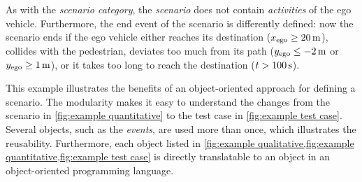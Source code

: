 As with the \textit{scenario category}, the \textit{scenario} does not contain \textit{activities} of the ego vehicle. 
\cstartb Furthermore, the end event of the scenario is differently defined: now the scenario ends if the ego vehicle either reaches its destination ($x_{\mathrm{ego}} \geq \SI{20}{\meter}$), collides with the pedestrian, deviates too much from its path ($y_{\mathrm{ego}} \leq \SI{-2}{\meter}$ or $y_{\mathrm{ego}} \geq \SI{1}{\meter}$), or it takes too long to reach the destination ($t > \SI{100}{\second}$). \cendb

\cstartd This example illustrates the benefits of an object-oriented approach for defining a scenario. The modularity makes it easy to understand the changes from the scenario in \cref{fig:example quantitative} to the test case in \cref{fig:example test case}. Several objects, such as the \textit{events}, are used more than once, which illustrates the reusability. Furthermore, each object listed in \cref{fig:example qualitative,fig:example quantitative,fig:example test case} is directly translatable to an object in an object-oriented programming language. \cendd

